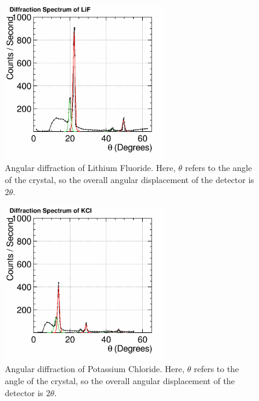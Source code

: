 \documentclass[%
 reprint,
 amsmath,amssymb,
 aps,
 pra,
]{revtex4-1}
\begin{document}
\begin{figure}[H]
	\centering
	\includegraphics[width=7cm]{Diffraction_LiF.png}
	\caption{Angular diffraction of Lithium Fluoride. Here, $\theta$ refers to the angle of the crystal, so the overall angular displacement of the detector is $2 \theta$.}
	\label{fig:LiF}
\end{figure}

\begin{figure}[H]
	\centering
	\includegraphics[width=7cm]{Diffraction_KCl.png}
	\caption{Angular diffraction of Potassium Chloride. Here, $\theta$ refers to the angle of the crystal, so the overall angular displacement of the detector is $2 \theta$.}
	\label{fig:KCl}
\end{figure}
\end{document}
